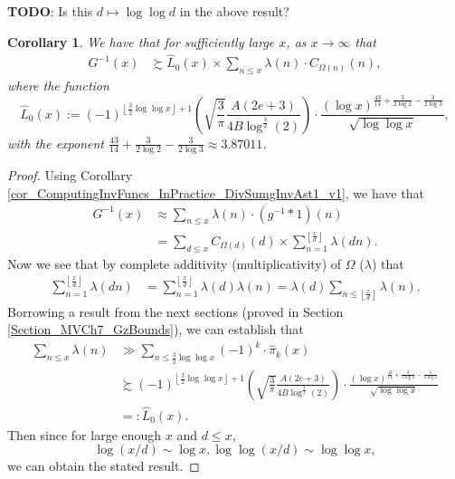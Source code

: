 \documentclass[11pt,reqno,a4letter]{article}
\numberwithin{figure}{section}
\numberwithin{table}{section}
\newcommand{\floor}[1]{\left\lfloor #1 \right\rfloor}
\newcommand{\Floor}[2]{\ensuremath{\left\lfloor \frac{#1}{#2} \right\rfloor}}
\theoremstyle{plain}
\newtheorem{cor}[theorem]{Corollary}
\numberwithin{theorem}{section}
\theoremstyle{definition}
\begin{document}
\textbf{TODO}: Is this $d \mapsto \log\log d$ in the above result? 

\begin{cor} 
\label{cor_ASemiForm_ForGInvx_v1} 
We have that for sufficiently large $x$, as $x \rightarrow \infty$ that 
\begin{align*} 
G^{-1}(x) & \succsim \widehat{L}_0(x) \times \sum_{n \leq x} 
     \lambda(n) \cdot C_{\Omega(n)}(n), 
\end{align*} 
where the function 
\[
\widehat{L}_0(x) := (-1)^{\floor{\frac{3}{2} \log\log x} + 1} \left( 
     \sqrt{\frac{3}{\pi}} \frac{A (2e+3)}{4B \log^{\frac{3}{2}}(2)}\right) \cdot 
     \frac{(\log x)^{\frac{43}{14} + \frac{3}{2 \log 2} - \frac{3}{2 \log 3}}}{ 
     \sqrt{\log\log x}}, 
\]
with the exponent $\frac{43}{14} + \frac{3}{2 \log 2} - \frac{3}{2 \log 3} \approx 3.87011$. 
\end{cor} 
\begin{proof} 
Using Corollary \ref{cor_ComputingInvFuncs_InPractice_DivSumgInvAst1_v1}, we have that 
\begin{align*} 
G^{-1}(x) & \approx \sum_{n \leq x} \lambda(n) \cdot (g^{-1} \ast 1)(n) \\ 
     & = \sum_{d \leq x} C_{\Omega(d)}(d) \times \sum_{n=1}^{\Floor{x}{d}} \lambda(dn). 
\end{align*} 
Now we see that by complete additivity (multiplicativity) of $\Omega$ ($\lambda$) that 
\begin{align*} 
\sum_{n=1}^{\Floor{x}{d}} \lambda(dn) & = \sum_{n=1}^{\Floor{x}{d}} \lambda(d) \lambda(n) 
     = \lambda(d) \sum_{n \leq \Floor{x}{d}} \lambda(n). 
\end{align*} 
Borrowing a result from the next sections 
(proved in Section \ref{Section_MVCh7_GzBounds}), 
we can establish that 
\begin{align*} 
\sum_{n \leq x} \lambda(n) & \gg \sum_{n \leq \frac{3}{2} \log\log x} (-1)^k \cdot \widehat{\pi}_k(x) \\ 
     & \succsim (-1)^{\floor{\frac{3}{2} \log\log x} + 1} \left( 
     \sqrt{\frac{3}{\pi}} \frac{A (2e+3)}{4B \log^{\frac{3}{2}}(2)}\right) \cdot 
     \frac{(\log x)^{\frac{43}{14} + \frac{3}{2 \log 2} - \frac{3}{2 \log 3}}}{ 
     \sqrt{\log\log x}} \\ 
     & =: \widehat{L}_0(x). 
\end{align*} 
Then since for large enough $x$ and $d \leq x$, 
\[
\log(x/d) \sim \log x, \log\log(x/d) \sim \log\log x, 
\] 
we can obtain the stated result. 
\end{proof} 
\end{document}
